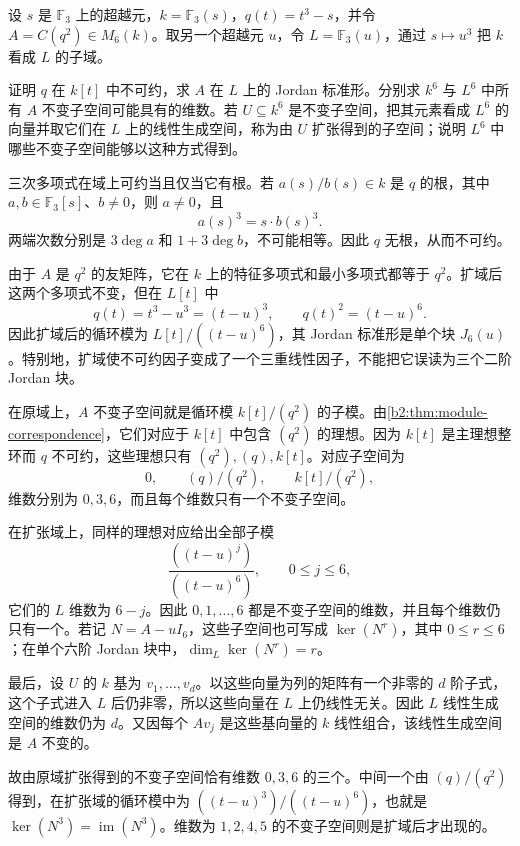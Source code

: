 \begin{exercise}
	\label{b2:ex:04-inseparable-new-subspaces}
	设 \(s\) 是 \(\mathbb F_3\) 上的超越元，\(k=\mathbb F_3(s)\)，\(q(t)=t^3-s\)，并令 \(A=C(q^2)\in M_6(k)\)。取另一个超越元 \(u\)，令 \(L=\mathbb F_3(u)\)，通过 \(s\mapsto u^3\) 把 \(k\) 看成 \(L\) 的子域。

	证明 \(q\) 在 \(k[t]\) 中不可约，求 \(A\) 在 \(L\) 上的 Jordan 标准形。分别求 \(k^6\) 与 \(L^6\) 中所有 \(A\) 不变子空间可能具有的维数。若 \(U\subseteq k^6\) 是不变子空间，把其元素看成 \(L^6\) 的向量并取它们在 \(L\) 上的线性生成空间，称为由 \(U\) 扩张得到的子空间；说明 \(L^6\) 中哪些不变子空间能够以这种方式得到。
\end{exercise}

\begin{solution}
	三次多项式在域上可约当且仅当它有根。若 \(a(s)/b(s)\in k\) 是 \(q\) 的根，其中 \(a,b\in\mathbb F_3[s]\)、\(b\ne0\)，则 \(a\ne0\)，且
	\[
		a(s)^3=s\cdot b(s)^3.
	\]
	两端次数分别是 \(3\deg a\) 和 \(1+3\deg b\)，不可能相等。因此 \(q\) 无根，从而不可约。

	由于 \(A\) 是 \(q^2\) 的友矩阵，它在 \(k\) 上的特征多项式和最小多项式都等于 \(q^2\)。扩域后这两个多项式不变，但在 \(L[t]\) 中
	\[
		q(t)=t^3-u^3=(t-u)^3,\qquad q(t)^2=(t-u)^6.
	\]
	因此扩域后的循环模为 \(L[t]/((t-u)^6)\)，其 Jordan 标准形是单个块 \(J_6(u)\)。特别地，扩域使不可约因子变成了一个三重线性因子，不能把它误读为三个二阶 Jordan 块。

	在原域上，\(A\) 不变子空间就是循环模 \(k[t]/(q^2)\) 的子模。由\cref{b2:thm:module-correspondence}，它们对应于 \(k[t]\) 中包含 \((q^2)\) 的理想。因为 \(k[t]\) 是主理想整环而 \(q\) 不可约，这些理想只有 \((q^2),(q),k[t]\)。对应子空间为
	\[
		0,\qquad (q)/(q^2),\qquad k[t]/(q^2),
	\]
	维数分别为 \(0,3,6\)，而且每个维数只有一个不变子空间。

	在扩张域上，同样的理想对应给出全部子模
	\[
		\frac{((t-u)^j)}{((t-u)^6)},\qquad 0\le j\le6,
	\]
	它们的 \(L\) 维数为 \(6-j\)。因此 \(0,1,\ldots,6\) 都是不变子空间的维数，并且每个维数仍只有一个。若记 \(N=A-uI_6\)，这些子空间也可写成 \(\ker(N^r)\)，其中 \(0\le r\le6\)；在单个六阶 Jordan 块中，\(\dim_L\ker(N^r)=r\)。

	最后，设 \(U\) 的 \(k\) 基为 \(v_1,\ldots,v_d\)。以这些向量为列的矩阵有一个非零的 \(d\) 阶子式，这个子式进入 \(L\) 后仍非零，所以这些向量在 \(L\) 上仍线性无关。因此 \(L\) 线性生成空间的维数仍为 \(d\)。又因每个 \(Av_j\) 是这些基向量的 \(k\) 线性组合，该线性生成空间是 \(A\) 不变的。

	故由原域扩张得到的不变子空间恰有维数 \(0,3,6\) 的三个。中间一个由 \((q)/(q^2)\) 得到，在扩张域的循环模中为 \(((t-u)^3)/((t-u)^6)\)，也就是 \(\ker(N^3)=\operatorname{im}(N^3)\)。维数为 \(1,2,4,5\) 的不变子空间则是扩域后才出现的。
\end{solution}
